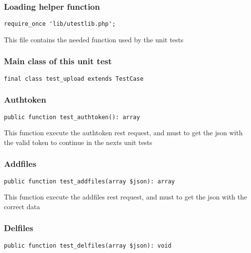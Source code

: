 \documentclass[a4paper]{article}
\begin{document}
\hypertarget{toc366}{}
\subsubsection{Loading helper function}

\begin{lstlisting}
require_once 'lib/utestlib.php';
\end{lstlisting}

This file contains the needed function used by the unit tests

\hypertarget{toc367}{}
\subsubsection{Main class of this unit test}

\begin{lstlisting}
final class test_upload extends TestCase
\end{lstlisting}

\hypertarget{toc368}{}
\subsubsection{Authtoken}

\begin{lstlisting}
public function test_authtoken(): array
\end{lstlisting}

This function execute the authtoken rest request, and must to get the
json with the valid token to continue in the nexts unit tests

\hypertarget{toc369}{}
\subsubsection{Addfiles}

\begin{lstlisting}
public function test_addfiles(array $json): array
\end{lstlisting}

This function execute the addfiles rest request, and must to get the
json with the correct data

\hypertarget{toc370}{}
\subsubsection{Delfiles}

\begin{lstlisting}
public function test_delfiles(array $json): void
\end{lstlisting}
\end{document}
